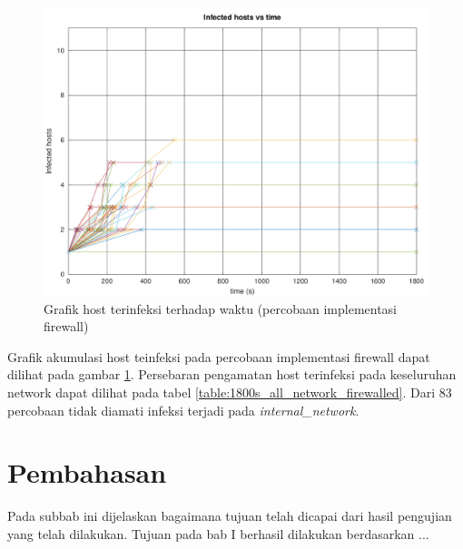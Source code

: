 \begin{figure}[H]
	\centering
	\includegraphics[width=\textwidth]{resources/infection_control_over_time_firewalled.png}
	\caption{Grafik host terinfeksi terhadap waktu (percobaan implementasi firewall)}
	\label{fig:infection_control_over_time_firewalled}
\end{figure}

Grafik akumulasi host teinfeksi pada percobaan implementasi firewall dapat dilihat pada gambar \ref{fig:infection_control_over_time_firewalled}. Persebaran pengamatan host terinfeksi pada keseluruhan network dapat dilihat pada tabel \ref{table:1800s_all_network_firewalled}. Dari 83 percobaan tidak diamati infeksi terjadi pada \textit{internal\_network}.

\section{Pembahasan}

Pada subbab ini dijelaskan bagaimana tujuan telah dicapai dari hasil pengujian yang telah dilakukan. Tujuan pada bab I berhasil dilakukan berdasarkan ...

